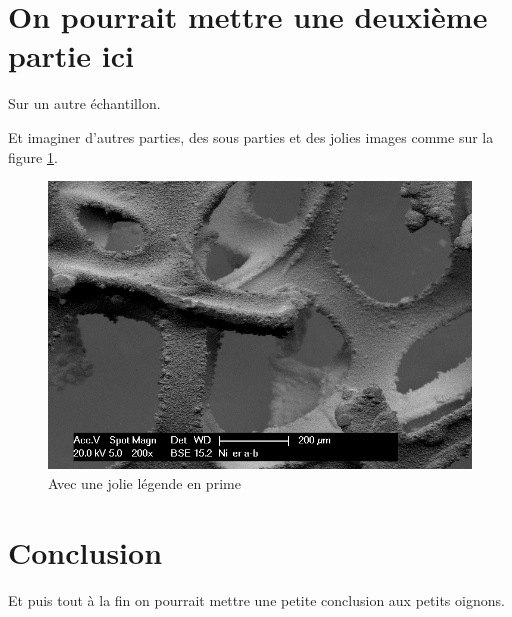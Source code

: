 \documentclass[a4paper,12pt]{article}
\begin{document}
 

\section{On pourrait mettre une deuxième partie ici}

Sur un autre échantillon.

\vspace{5cm}

Et imaginer d'autres parties, des sous parties et des jolies images comme sur la figure \ref{fig:ni_er_amb}.

\begin{figure}
\centering
\includegraphics[width = 0.7 \textwidth]{images/ni_er_amb.png}
\caption{Avec une jolie légende en prime}
\label{fig:ni_er_amb}
\end{figure}

\section*{Conclusion}

Et puis tout à la fin on pourrait mettre une petite conclusion aux petits oignons.
\end{document}
